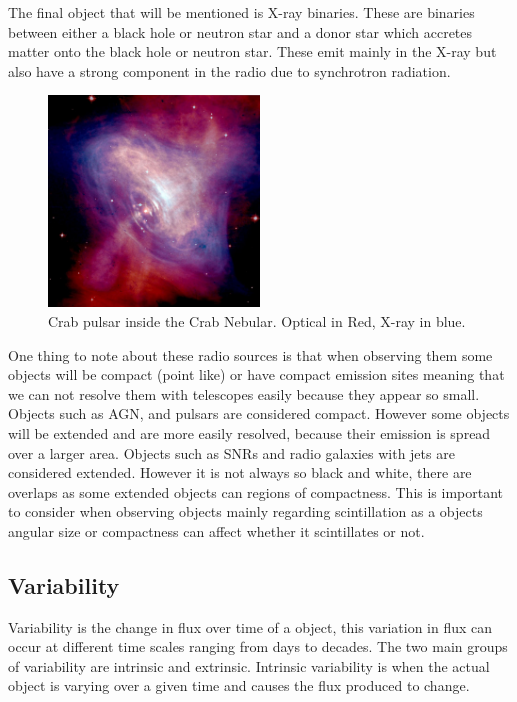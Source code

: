 \documentclass[10pt,a4paper]{article}
\begin{document}
The final object that will be mentioned is X-ray binaries. These are binaries between either a black hole or neutron star and a donor star which accretes matter onto the black hole or neutron star. These emit mainly in the X-ray but also have a strong component in the radio due to synchrotron radiation.
\begin{figure}[H]
\begin{center}
	\includegraphics[width=0.5\textwidth]{pulsar}
	\caption{Crab pulsar inside the Crab Nebular. Optical in Red, X-ray in blue\footnotemark.}
	\label{pulsar}
\end{center}
\end{figure}
One thing to note about these radio sources is that when observing them some objects will be compact (point like) or have compact emission sites meaning that we can not resolve them with telescopes easily because they appear so small. Objects such as AGN, and pulsars are considered compact. 
However some objects will be extended and are more easily resolved, because their emission is spread over a larger area. Objects such as SNRs and radio galaxies with jets are considered extended. However it is not always so black and white, there are overlaps as some extended objects can regions of compactness. This is important to consider when observing objects mainly regarding scintillation as a objects angular size or compactness can affect whether it scintillates or not.

\subsection{Variability}
Variability is the change in flux over time of a object, this variation in flux can occur at different time scales ranging from days to decades. The two main groups of variability are intrinsic and extrinsic. Intrinsic variability is when the actual object is varying over a given time and causes the flux produced to change.\\
\end{document}
